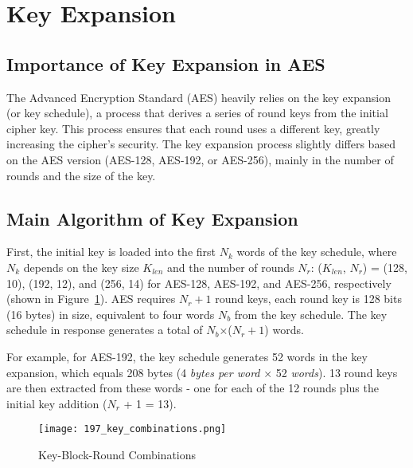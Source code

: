 \section{Key Expansion}

\subsection{Importance of Key Expansion in AES} 

The Advanced Encryption Standard (AES) heavily relies on the key expansion (or key schedule), 
a process that derives a series of round keys from the initial cipher key. 
This process ensures that each round uses a different key, 
greatly increasing the cipher's security. The key expansion process slightly differs 
based on the AES version (AES-128, AES-192, or AES-256), mainly in the number of rounds 
and the size of the key.

\subsection{Main Algorithm of Key Expansion}

First, the initial key is loaded into the first $N_k$ words of the key schedule, where $N_k$ depends 
on the key size $K_{len}$ and the number of rounds $N_r$: ($K_{len}$, $N_r$) = (128, 10), (192, 12), and (256, 14) 
for AES-128, AES-192, and AES-256, respectively \cite{Key_Collisions} (shown in Figure~\ref{fig:key_comb}). AES requires $N_r+1$ round keys, each round key is 
128 bits (16 bytes) in size, equivalent to four words $N_b$ from the key schedule. The key schedule in 
response generates a total of $N_b$×($N_r+1$) words\cite{Standards2001}. \newline

For example, for AES-192, the key schedule generates 52 words in the key expansion, which equals 208 bytes (4 \textit{bytes per word} × 52 \textit{words}).
13 round keys are then extracted from these words - one for each of the 12 rounds plus the initial key addition ($N_r$ + 1 = 13).

\begin{figure}[h] %
    \centering
    \texttt{[image: 197\_key\_combinations.png]} %
    \caption{
        Key-Block-Round Combinations \cite{Standards2001}
    }
    \label{fig:key_comb} %
\end{figure}

